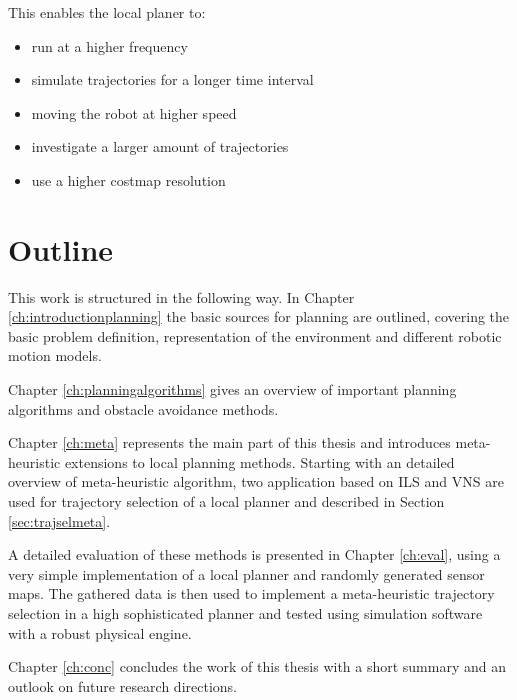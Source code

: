This enables the local planer to:
\begin{itemize}
\item run at a higher frequency
\item simulate trajectories for a longer time interval
\item moving the robot at higher speed
\item investigate a larger amount of trajectories
\item use a higher costmap resolution
\end{itemize}

\section{Outline}\label{sec:outline}
This work is structured in the following way. 
In Chapter \ref{ch:introductionplanning} the basic sources for planning are outlined, covering the basic problem definition, representation of the environment and different robotic motion models. 

Chapter \ref{ch:planningalgorithms} gives an overview of important planning algorithms and obstacle avoidance methods.
 
Chapter \ref{ch:meta} represents the main part of this thesis and introduces meta-heuristic extensions to local planning methods. 
Starting with an detailed overview of  meta-heuristic algorithm, two application based on ILS and VNS are used for trajectory selection of a local planner and described in Section \ref{sec:trajselmeta}.

A detailed evaluation of these methods is presented in Chapter \ref{ch:eval}, using a very simple implementation of a local planner and randomly generated sensor maps. 
The gathered data is then used to implement a meta-heuristic trajectory selection in a high sophisticated planner and tested using simulation software with a robust physical engine.

Chapter \ref{ch:conc} concludes the work of this thesis with a short summary and an outlook on future research directions.





